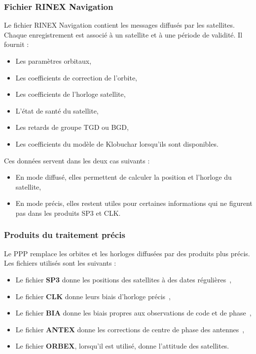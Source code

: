 \subsubsection{Fichier RINEX Navigation}

Le fichier RINEX Navigation contient les messages diffusés par les satellites.
Chaque enregistrement est associé à un satellite et à une période de validité.
Il fournit :

\begin{itemize}
    \item Les paramètres orbitaux,
    \item Les coefficients de correction de l'orbite,
    \item Les coefficients de l'horloge satellite,
    \item L'état de santé du satellite,
    \item Les retards de groupe TGD ou BGD,
    \item Les coefficients du modèle de Klobuchar lorsqu'ils sont disponibles.
\end{itemize}

Ces données servent dans les deux cas suivants :

\begin{itemize}
    \item En mode diffusé, elles permettent de calculer la position et
    l'horloge du satellite,
    \item En mode précis, elles restent utiles pour certaines informations qui
    ne figurent pas dans les produits SP3 et CLK.
\end{itemize}

\subsubsection{Produits du traitement précis}

Le PPP remplace les orbites et les horloges diffusées par des produits plus
précis. Les fichiers utilisés sont les suivants :

\begin{itemize}
    \item Le fichier \textbf{SP3} donne les positions des satellites à des
    dates régulières~\cite{hilla2016sp3d},
    \item Le fichier \textbf{CLK} donne leurs biais d'horloge
    précis~\cite{rinexClock304},
    \item Le fichier \textbf{BIA} donne les biais propres aux observations de
    code et de phase~\cite{schaerSinexBias},
    \item Le fichier \textbf{ANTEX} donne les corrections de centre de phase
    des antennes~\cite{antexFormat},
    \item Le fichier \textbf{ORBEX}, lorsqu'il est utilisé, donne l'attitude
    des satellites.
\end{itemize}

